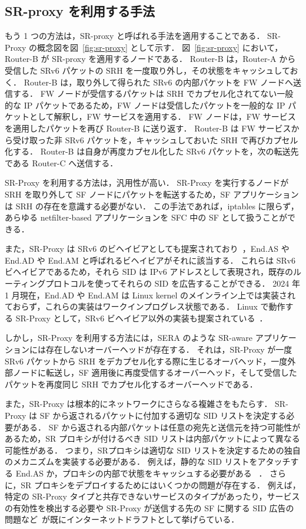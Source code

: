 \subsection*{SR-proxy を利用する手法}
\label{sbsection:use-sr-proxy}
もう 1 つの方法は，SR-proxy と呼ばれる手法を適用することである．
SR-Proxy の概念図を図~\ref*{fig:sr-proxy} として示す．
図~\ref*{fig:sr-proxy} において，Router-B が SR-proxy を適用するノードである．
Router-B は，Router-A から受信した SRv6 パケットの SRH を一度取り外し，その状態をキャッシュしておく．
Router-B は，取り外して得られた SRv6 の内部パケットを FW ノードへ送信する．
FW ノードが受信するパケットは SRH でカプセル化されてない一般的な IP パケットであるため，FW ノードは受信したパケットを一般的な IP パケットとして解釈し，FW サービスを適用する．
FW ノードは，FW サービスを適用したパケットを再び Router-B に送り返す．
Router-B は FW サービスから受け取った非 SRv6 パケットを，キャッシュしておいた SRH で再びカプセル化する．
Router-B は自身が再度カプセル化した SRv6 パケットを，次の転送先である Router-C へ送信する．

SR-Proxy を利用する方法は，汎用性が高い．
SR-Proxy を実行するノードが SRH を取り外して SF ノードにパケットを転送するため，SF アプリケーションは SRH の存在を意識する必要がない．
この手法であれば，iptables に限らず，あらゆる netfilter-based アプリケーションを SFC 中の SF として扱うことができる．

また，SR-Proxy は SRv6 のビヘイビアとしても提案されており~\cite{filsfils-spring-srv6-interop-02}，End.AS や End.AD や End.AM と呼ばれるビヘイビアがそれに該当する．
これらは SRv6 ビヘイビアであるため，それら SID は IPv6 アドレスとして表現され，既存のルーティングプロトコルを使ってそれらの SID を広告することができる．
2024 年 1 月現在，End.AD や End.AM は Linux kernel のメインライン上では実装されておらず，これらの実装はワークインプログレス状態である．
Linux で動作する SR-Proxy として，SRv6 ビヘイビア以外の実装も提案されている~\cite{sfc-proxy-bpf,sfc-with-leg-vnf,afxdp-for-srv6}．

しかし，SR-Proxy を利用する方法には，SERA のような SR-aware アプリケーションには存在しないオーバーヘッドが存在する．
それは，SR-Proxy が一度 SRv6 パケットから SRH をデカプセル化する際に生じるオーバヘッド，一度外部ノードに転送し，SF 適用後に再度受信するオーバーヘッド，そして受信したパケットを再度同じ SRH でカプセル化するオーバーヘッドである．

また，SR-Proxy は根本的にネットワークにさらなる複雑さをもたらす．
SR-Proxy は SF から返されるパケットに付加する適切な SID リストを決定する必要がある．
SF から返される内部パケットは任意の宛先と送信元を持つ可能性があるため，SR プロキシが付けるべき SID リストは内部パケットによって異なる可能性がある．
つまり，SRプロキシは適切な SID リストを決定するための独自のメカニズムを実装する必要がある．
例えば，静的な SID リストをアタッチする End.AS か，プロキシの内部で状態をキャッシュする必要がある~\cite{sfc-proxy-bpf} ．
さらに，SR プロキシをデプロイするためにはいくつかの問題が存在する．
例えば，特定の SR-Proxy タイプと共存できないサービスのタイプがあったり，サービスの有効性を検出する必要や SR-Proxy が送信する先の SF に関する SID 広告の問題など~\cite{draft-scexp}が既にインターネットドラフトとして挙げらている．

